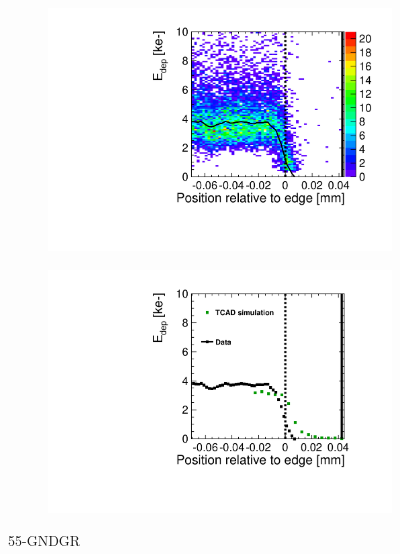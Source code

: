 \begin{figure}[htbp]
  \centering
  \begin{subfigure}[b]{0.5\linewidth}
    \includegraphics[width=\textwidth]{figures/ActiveEdge/TCAD_data_Edep_55_GNDGR.pdf}
    \caption{}
  \end{subfigure}\hfill
  \begin{subfigure}[b]{0.5\linewidth}
    \includegraphics[width=\textwidth]{figures/ActiveEdge/TCAD_data_55_GNDGR.pdf}
    \caption{}
  \end{subfigure}
  \caption{55-GNDGR}
  \label{fig:TCAD_vs_data_55_GNDGR}
\end{figure}


